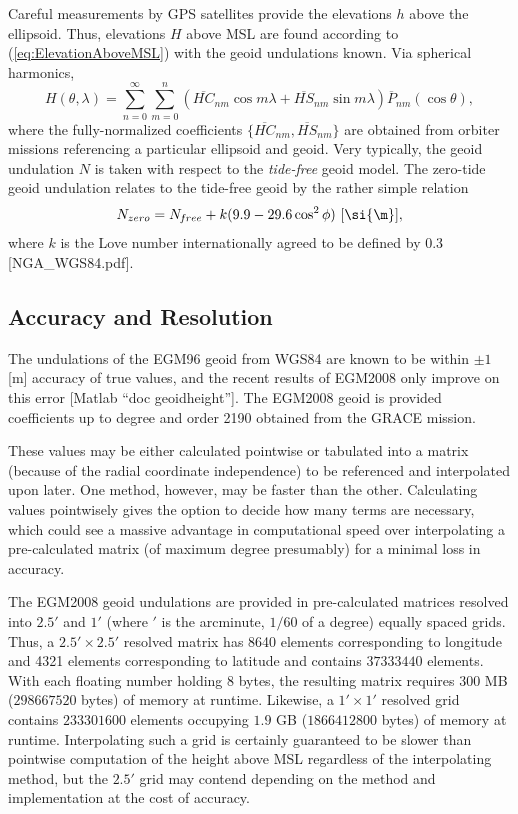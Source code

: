 \documentclass[11pt,dvipsnames]{thesis}
\begin{document}
Careful measurements by GPS satellites provide the elevations $h$ above the ellipsoid. Thus, elevations $H$ above MSL are found according to (\ref{eq:ElevationAboveMSL}) with the geoid undulations known. Via spherical harmonics,
\begin{equation}
H(\theta, \lambda) = \sum_{n = 0}^\infty \sum_{m = 0}^n (\overline{H\!C}_{nm} \cos m\lambda + \overline{H\!S}_{nm} \sin m\lambda) \overline{P}_{nm}(\cos\theta), \label{eq:HeightAboveMSL}
\end{equation}
where the fully-normalized coefficients $\{\overline{H\!C}_{nm}, \overline{H\!S}_{nm}\}$ are obtained from orbiter missions referencing a particular ellipsoid and geoid.
Very typically, the geoid undulation $N$ is taken with respect to the \textit{tide-free} geoid model. The zero-tide geoid undulation relates to the tide-free geoid by the rather simple relation
\begin{equation}
N_{zero} = N_{\hspace{-0.1ex}f\hspace{-0.1ex}ree} + k(9.9 - 29.6 \cos^2\phi) \ [\si{\m}], 
\end{equation}
where $k$ is the Love number internationally agreed to be defined by 0.3 [NGA\_WGS84.pdf]. 


\subsection{Accuracy and Resolution}
The undulations of the EGM96 geoid from WGS84 are known to be within $\pm 1$ [\si{\m}] accuracy of true values, and the recent results of EGM2008 only improve on this error [Matlab ``doc geoidheight'']. The EGM2008 geoid is provided coefficients up to degree and order 2190 obtained from the GRACE mission. 

These values may be either calculated pointwise or tabulated into a matrix (because of the radial coordinate independence) to be referenced and interpolated upon later. One method, however, may be faster than the other. Calculating values pointwisely gives the option to decide how many terms are necessary, which could see a massive advantage in computational speed over interpolating a pre-calculated matrix (of maximum degree presumably) for a minimal loss in accuracy.

The EGM2008 geoid undulations are provided in pre-calculated matrices resolved into $2.5'$ and $1'$ (where $'$ is the arcminute, $1/60$ of a degree) equally spaced grids. Thus, a $2.5' \times 2.5'$ resolved matrix has 8640 elements corresponding to longitude and 4321 elements corresponding to latitude and contains $37333440$ elements. With each floating number holding $8$ bytes, the resulting matrix requires $300$ MB ($298667520$ bytes) of memory at runtime. Likewise, a $1' \times 1'$ resolved grid contains $233301600$ elements occupying $1.9$ GB ($1866412800$ bytes) of memory at runtime. Interpolating such a grid is certainly guaranteed to be slower than pointwise computation of the height above MSL regardless of the interpolating method, but the $2.5'$ grid may contend depending on the method and implementation at the cost of accuracy.
\end{document}
